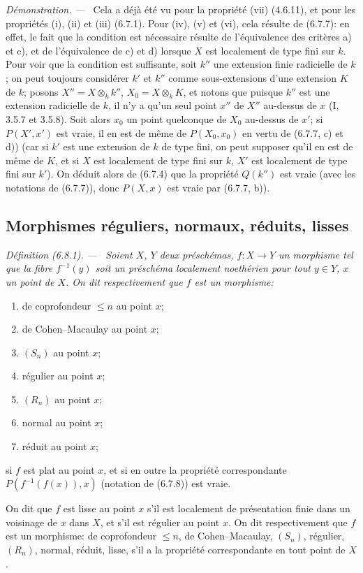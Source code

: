 \documentclass[10pt,oneside]{book}
\newcommand{\oldpage}[2][]{%
  \setcounter{footnote}{0}%
  \marginpar{\scriptsize\textbf{#1}~|~#2}\ignorespaces}
\newenvironment{definition}[1][]{%
  \par\medskip\noindent\itshape Définition (#1). ---\ }{\par}
\newenvironment{proof}{%
  \par\medskip\noindent\textit{Démonstration. ---\ }}{\par}
\begin{document}
\begin{proof}
Cela a déjà été vu pour la propriété (vii) (4.6.11), et pour les propriétés
(i), (ii) et (iii) (6.7.1). Pour (iv), (v) et (vi), cela résulte de (6.7.7):
en effet, le fait que la condition est nécessaire résulte de l'équivalence des
critères a) et c), et de l'équivalence de c) et d) lorsque $X$ est localement
de type fini sur $k$. Pour voir que la condition est suffisante, soit $k''$ une
extension finie radicielle de $k$; on peut toujours considérer $k'$ et $k''$
comme sous-extensions d'une extension $K$ de $k$; posons
$X''=X\otimes_k k''$, $X_0=X\otimes_k K$, et notons que puisque $k''$ est une
extension radicielle de $k$, il n'y a qu'un seul point $x''$ de $X''$ au-dessus
de $x$ (I, 3.5.7 et 3.5.8). Soit alors $x_0$ un point quelconque de $X_0$
au-dessus de $x'$; si $P(X',x')$ est vraie, il en est de même de $P(X_0,x_0)$
en vertu de (6.7.7, c) et d)) (car si $k'$ est une extension de $k$ de type
fini, on peut supposer qu'il en est de même de $K$, et si $X$ est localement
de type fini sur $k$, $X'$ est localement de type fini sur $k'$). On déduit
alors de (6.7.4) que la propriété $Q(k'')$ est vraie (avec les notations de
(6.7.7)), donc $P(X,x)$ est vraie par (6.7.7, b)).
\end{proof}

\subsection{Morphismes réguliers, normaux, réduits, lisses}
\label{subsection:IV.6.8}

\oldpage[IV-2]{150}

\begin{definition}[6.8.1]
\label{IV.2.s6.8.1-fr}
Soient $X$, $Y$ deux préschémas, $f:X\to Y$ un morphisme tel que la fibre
$f^{-1}(y)$ soit un préschéma localement noethérien pour tout $y\in Y$, $x$
un point de $X$. On dit respectivement que $f$ est un morphisme:
\begin{enumerate}
\item[(i)] de coprofondeur $\leq n$ au point $x$;
\item[(ii)] de Cohen--Macaulay au point $x$;
\oldpage[IV-2]{151}
\item[(iii)] $(S_n)$ au point $x$;
\item[(iv)] régulier au point $x$;
\item[(v)] $(R_n)$ au point $x$;
\item[(vi)] normal au point $x$;
\item[(vii)] réduit au point $x$;
\end{enumerate}
si $f$ est plat au point $x$, et si en outre la propriété correspondante
$P(f^{-1}(f(x)),x)$ (notation de (6.7.8)) est vraie.

On dit que $f$ est lisse au point $x$ s'il est localement de présentation finie
dans un voisinage de $x$ dans $X$, et s'il est régulier au point $x$. On dit
respectivement que $f$ est un morphisme: de coprofondeur $\leq n$, de
Cohen--Macaulay, $(S_n)$, régulier, $(R_n)$, normal, réduit, lisse, s'il a la
propriété correspondante en tout point de $X$.
\end{definition}
\end{document}
